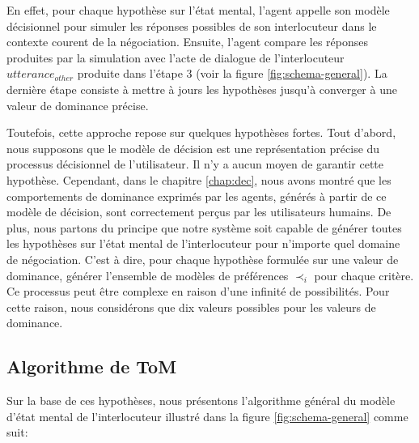 En effet, pour chaque hypothèse sur l'état mental, l'agent appelle son modèle décisionnel  pour simuler les réponses possibles de son interlocuteur dans le contexte courent de la négociation. Ensuite, l'agent compare les réponses produites par la simulation avec l'acte de dialogue de l'interlocuteur $utterance_{other}$ produite dans l'étape 3 (voir la figure \ref{fig:schema-general}). 
La dernière étape consiste à mettre à jours les hypothèses jusqu'à converger à une valeur de dominance précise. 

Toutefois, cette approche repose sur quelques hypothèses fortes. Tout d'abord, nous supposons que le modèle de décision est une représentation précise du processus décisionnel de l'utilisateur. Il n'y a aucun moyen de garantir cette hypothèse. Cependant, dans le chapitre \ref{chap:dec}, nous avons montré que les comportements de dominance exprimés par les agents, générés à partir de ce modèle de décision, sont correctement perçus par les utilisateurs humains. 
De plus, nous partons du principe que notre système soit capable de générer toutes les hypothèses sur l'état mental de l'interlocuteur pour n'importe quel domaine de négociation. C'est à dire, pour chaque hypothèse formulée sur une valeur de dominance, générer l'ensemble de modèles de préférences $\prec_i$ pour chaque critère. Ce processus peut être complexe en raison d'une infinité de possibilités. Pour cette raison, nous considérons que dix valeurs possibles pour les valeurs de dominance. 

	\subsection{Algorithme de ToM}
Sur la base de ces hypothèses, nous présentons l'algorithme général du modèle d'état mental de l'interlocuteur illustré dans la figure \ref{fig:schema-general} comme suit:


